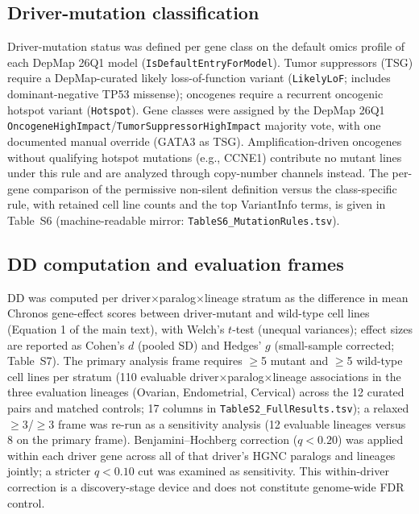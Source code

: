 \documentclass[11pt,a4paper]{article}
\begin{document}
\subsection{Driver-mutation classification}
Driver-mutation status was defined per gene class on the default omics profile of each DepMap 26Q1 model (\texttt{IsDefaultEntryForModel}). Tumor suppressors (TSG) require a DepMap-curated likely loss-of-function variant (\texttt{LikelyLoF}; includes dominant-negative TP53 missense); oncogenes require a recurrent oncogenic hotspot variant (\texttt{Hotspot}). Gene classes were assigned by the DepMap 26Q1 \texttt{OncogeneHighImpact}/\texttt{TumorSuppressorHighImpact} majority vote, with one documented manual override (GATA3 as TSG). Amplification-driven oncogenes without qualifying hotspot mutations (e.g., CCNE1) contribute no mutant lines under this rule and are analyzed through copy-number channels instead. The per-gene comparison of the permissive non-silent definition versus the class-specific rule, with retained cell line counts and the top VariantInfo terms, is given in Table~S6 (machine-readable mirror: \texttt{TableS6\_MutationRules.tsv}).

\subsection{DD computation and evaluation frames}
DD was computed per driver$\times$paralog$\times$lineage stratum as the difference in mean Chronos gene-effect scores between driver-mutant and wild-type cell lines (Equation 1 of the main text), with Welch's $t$-test (unequal variances); effect sizes are reported as Cohen's $d$ (pooled SD) and Hedges' $g$ (small-sample corrected; Table~S7). The primary analysis frame requires $\ge$5 mutant and $\ge$5 wild-type cell lines per stratum (110 evaluable driver$\times$paralog$\times$lineage associations in the three evaluation lineages (Ovarian, Endometrial, Cervical) across the 12 curated pairs and matched controls; 17 columns in \texttt{TableS2\_FullResults.tsv}); a relaxed $\ge$3/$\ge$3 frame was re-run as a sensitivity analysis (12 evaluable lineages versus 8 on the primary frame). Benjamini--Hochberg correction ($q<0.20$) was applied within each driver gene across all of that driver's HGNC paralogs and lineages jointly; a stricter $q<0.10$ cut was examined as sensitivity. This within-driver correction is a discovery-stage device and does not constitute genome-wide FDR control.
\end{document}
